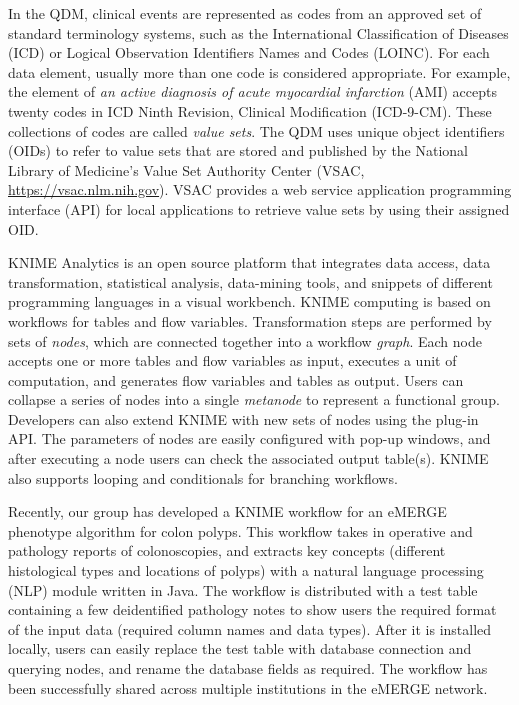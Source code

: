 \documentclass{article}
\begin{document}
In the QDM, clinical events are represented as codes from an approved set of standard terminology systems, such as the International Classification of Diseases (ICD) or Logical Observation Identifiers Names and Codes (LOINC). For each data element, usually more than one code is considered appropriate. For example, the element of \emph{an active diagnosis of acute myocardial infarction} (AMI) accepts twenty codes in ICD Ninth Revision, Clinical Modification (ICD-9-CM). These collections of codes are called \emph{value sets}. The QDM uses unique object identifiers (OIDs) to refer to value sets that are stored and published by the National Library of Medicine's Value Set Authority Center (VSAC, \url{https://vsac.nlm.nih.gov}). VSAC provides a web service application programming interface (API) for local applications to retrieve value sets by using their assigned OID.

KNIME Analytics is an open source platform that integrates data access, data transformation, statistical analysis, data-mining tools, and snippets of different programming languages in a visual workbench. KNIME computing is based on workflows for tables and flow variables. Transformation steps are performed by sets of \emph{nodes}, which are connected together into a workflow \emph{graph}. Each node accepts one or more tables and flow variables as input, executes a unit of computation, and generates flow variables and tables as output. Users can collapse a series of nodes into a single \emph{metanode} to represent a functional group. Developers can also extend KNIME with new sets of nodes using the plug-in API. The parameters of nodes are easily configured with pop-up windows, and after executing a node users can check the associated output table(s). KNIME also supports looping and conditionals for branching workflows. 

Recently, our group has developed a KNIME workflow for an eMERGE phenotype algorithm for colon polyps\cite{gawron_anatomic_2014}. This workflow takes in operative and pathology reports of colonoscopies, and extracts key concepts (different histological types and locations of polyps) with a natural language processing (NLP) module written in Java. The workflow is distributed with a test table containing a few deidentified pathology notes to show users the required format of the input data (required column names and data types). After it is installed locally, users can easily replace the test table with database connection and querying nodes, and rename the database fields as required. The workflow has been successfully shared across multiple institutions in the eMERGE network.
\end{document}
